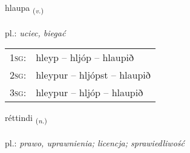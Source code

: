 \documentclass[frontgrid, backgrid]{flacards}\usepackage[]{graphicx}\usepackage[]{xcolor}
\begin{document}
\renewcommand{\flhead}{\vskip5pt \fboxsep=0pt {\small\bfseries\footnotesize Sagnorð | czasownik}}
\renewcommand{\fcfoot}{\vskip5pt \fboxsep=0pt \hspace{2pt}{\small\bfseries\footnotesize 1K}}

\renewcommand{\blhead}{\vskip5pt {\small\bfseries\footnotesize Sagnorð | czasownik }}
\renewcommand{\bcfoot}{\vskip5pt \hspace{2pt}{\small\bfseries\footnotesize 1K}}


{hlaupa \small{\textsubscript{(\textit{v.})}} \\[1ex] %
\textphonetic{[l̥œiːpa]} \\
pl.: \emph{uciec, biegać} \\  [2ex]
\renewcommand*{\arraystretch}{0.8}
\begin{tabular}{p{1cm}l}
\textsc{1sg}: & hleyp -- hljóp -- hlaupið \\ 
\textsc{2sg}: & hleypur -- hljópst -- hlaupið \\ 
\textsc{3sg}: & hleypur -- hljóp -- hlaupið \\ 
\end{tabular}
}

\renewcommand{\flhead}{\vskip5pt \fboxsep=0pt {\small\bfseries\footnotesize Nafnorð | rzeczownik}}
\renewcommand{\fcfoot}{\vskip5pt \fboxsep=0pt \hspace{2pt}{\small\bfseries\footnotesize 1K}}

\renewcommand{\blhead}{\vskip5pt {\small\bfseries\footnotesize Nafnorð | rzeczownik }}
\renewcommand{\bcfoot}{\vskip5pt \hspace{2pt}{\small\bfseries\footnotesize 1K}}


{réttindi \small{\textsubscript{(\textit{n.})}} \\[1ex] %
\textphonetic{[rjɛhtɪntɪ]} \\
pl.: \emph{prawo, uprawnienia; licencja;  sprawiedliwość} \\  [2ex]
\renewcommand*{\arraystretch}{0.8}
}
\end{document}
